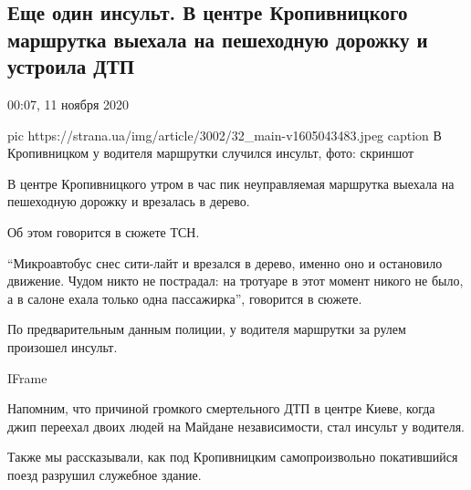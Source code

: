  
 
 

\subsection{Еще один инсульт. В центре Кропивницкого маршрутка выехала на пешеходную дорожку и устроила ДТП}
\label{sec:11_11_2020.news.ua.strana.2.dtp_insult_marshrutka_kirovograd}


00:07, 11 ноября 2020

\ifcmt
pic https://strana.ua/img/article/3002/32_main-v1605043483.jpeg
caption В Кропивницком у водителя маршрутки случился инсульт, фото: скриншот
\fi

В центре Кропивницкого утром в час пик неуправляемая маршрутка выехала на
пешеходную дорожку и врезалась в дерево.

Об этом говорится в сюжете ТСН.

\enquote{Микроавтобус снес сити-лайт и врезался в дерево, именно оно и остановило
движение. Чудом никто не пострадал: на тротуаре в этот момент никого не
было, а в салоне ехала только одна пассажирка}, \dshM говорится в сюжете.

По предварительным данным полиции, у водителя маршрутки за рулем произошел
инсульт.

IFrame

Напомним, что причиной громкого смертельного ДТП в центре Киеве, когда
джип переехал двоих людей на Майдане независимости, стал инсульт у
водителя.

Также мы рассказывали, как под Кропивницким самопроизвольно покатившийся
поезд разрушил служебное здание.


